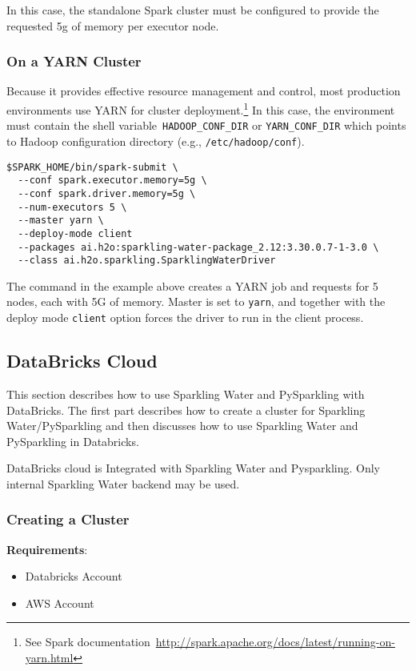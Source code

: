 In this case, the standalone Spark cluster must be configured to provide the requested 5g of memory per executor node.

\subsubsection{On a YARN Cluster}
Because it provides effective resource management and control, most production environments use YARN for cluster
deployment.\footnote{See Spark documentation~\url{http://spark.apache.org/docs/latest/running-on-yarn.html}}
In this case, the environment must contain the shell variable~\texttt{HADOOP\_CONF\_DIR} or \texttt{YARN\_CONF\_DIR} which
points to Hadoop configuration directory (e.g., \texttt{/etc/hadoop/conf}).

\begin{lstlisting}[style=Bash]
$SPARK_HOME/bin/spark-submit \ 
  --conf spark.executor.memory=5g \
  --conf spark.driver.memory=5g \
  --num-executors 5 \
  --master yarn \
  --deploy-mode client
  --packages ai.h2o:sparkling-water-package_2.12:3.30.0.7-1-3.0 \
  --class ai.h2o.sparkling.SparklingWaterDriver
\end{lstlisting}

The command in the example above creates a YARN job and requests for 5 nodes, each with 5G of memory. Master
is set to \texttt{yarn}, and together with the deploy mode \texttt{client} option forces the driver to run in the client process.

\subsection{DataBricks Cloud}
This section describes how to use Sparkling Water and PySparkling with DataBricks.
The first part describes how to create a cluster for Sparkling Water/PySparkling and then discusses how to use Sparkling Water and PySparkling in Databricks.


DataBricks cloud is Integrated with Sparkling Water and Pysparkling. Only internal Sparkling Water backend may be used.

\subsubsection{Creating a Cluster}

\textbf{Requirements}:
\begin{itemize}
    \item Databricks Account
    \item AWS Account
\end{itemize}

